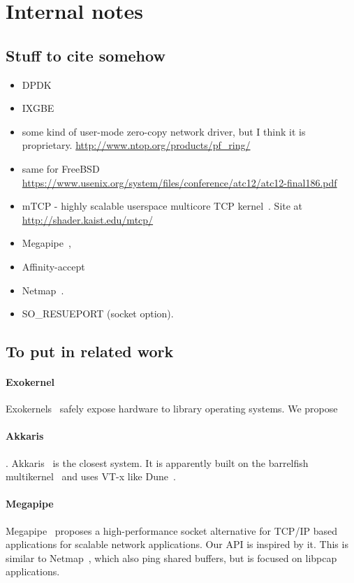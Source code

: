 
\section{Internal notes}


\subsection{Stuff to cite somehow}
\begin{itemize}


\item DPDK
\item IXGBE
\item some kind of user-mode zero-copy network driver, but I think it is proprietary. \url{http://www.ntop.org/products/pf_ring/}
\item same for FreeBSD \url{https://www.usenix.org/system/files/conference/atc12/atc12-final186.pdf}
\item mTCP - highly scalable userspace multicore TCP kernel~\cite{jeong2014mtcp}.  Site at \url{http://shader.kaist.edu/mtcp/}
\item Megapipe~\cite{han2012megapipe},
\item Affinity-accept~\cite{DBLP:conf/eurosys/PesterevSZM12}
\item Netmap~\cite{rizzo2012netmap}.
\item SO\_RESUEPORT (socket option).  
\end{itemize}



\subsection{To put in related work}

\paragraph*{Exokernel}   Exokernels~\cite{DBLP:conf/sosp/EnglerKO95} safely expose hardware to library operating systems.  We propose


\paragraph*{Akkaris}.  
Akkaris~\cite{peter2013arrakis} is the closest system.  It is
apparently built on the barrelfish multikernel~\cite{DBLP:conf/sosp/BaumannBDHIPRSS09} and uses VT-x
like Dune~\cite{belay2012dune}.

\paragraph*{Megapipe} 
Megapipe~\cite{han2012megapipe} proposes a high-performance socket
alternative for TCP/IP based applications for scalable network
applications.  Our API is inspired by it. This is similar to
Netmap~\cite{rizzo2012netmap}, which also ping shared buffers, but is
focused on libpcap applications.


